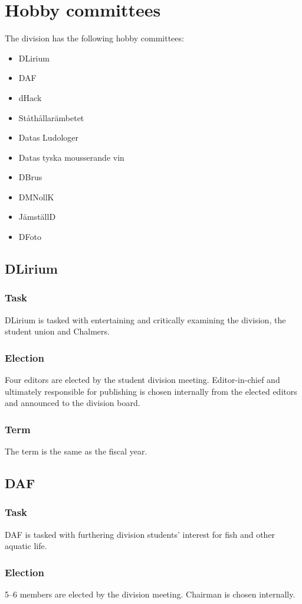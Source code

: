 \section{Hobby committees}
The division has the following hobby committees:
\begin{itemize}
  \item DLirium
  \item DAF
  \item dHack
  \item Ståthållarämbetet
  \item Datas Ludologer 
  \item Datas tyska mousserande vin
  \item DBrus
  \item DMNollK
  \item JämställD
  \item DFoto
\end{itemize}

\subsection{DLirium}
\subsubsection{Task}
DLirium is tasked with entertaining and critically examining the division, the student union and Chalmers.
\subsubsection{Election}
Four editors are elected by the student division meeting. Editor-in-chief and ultimately responsible for publishing is chosen internally from the elected editors and announced to the division board.
\subsubsection{Term}
The term is the same as the fiscal year. 

\subsection{DAF}
\subsubsection{Task}
DAF is tasked with furthering division students' interest for fish and other aquatic life. 
\subsubsection{Election}
5--6 members are elected by the division meeting. Chairman is chosen internally. 
